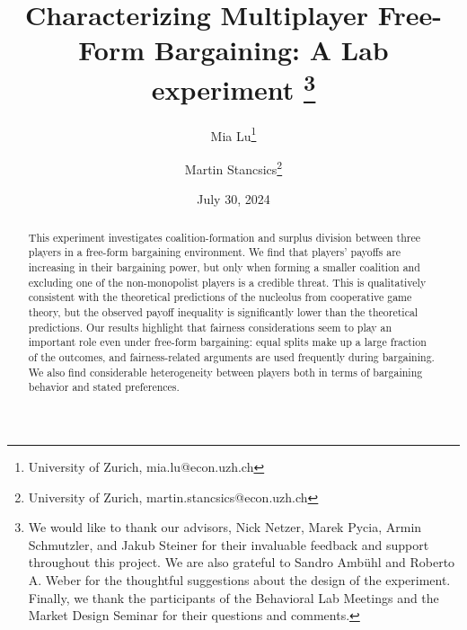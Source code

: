 \documentclass[a4paper]{article}
\title{
    Characterizing Multiplayer Free-Form Bargaining: A Lab experiment%
    \thanks{
        We would like to thank our advisors, Nick Netzer, Marek Pycia, Armin Schmutzler, and Jakub Steiner for their invaluable feedback and support throughout this project.
        We are also grateful to Sandro Ambühl and Roberto A. Weber for the thoughtful suggestions about the design of the experiment.
        Finally, we thank the participants of the Behavioral Lab Meetings and the Market Design Seminar for their questions and comments.
    }
}
\author{
    Mia Lu\thanks{University of Zurich, mia.lu@econ.uzh.ch} 
    \and 
    Martin Stancsics\thanks{University of Zurich, martin.stancsics@econ.uzh.ch}
}
\date{July 30, 2024 \\\vspace{0.4cm} \latestversion}
\begin{document}
\maketitle

\begin{abstract}
    This experiment investigates coalition-formation and surplus division between three players in a free-form bargaining environment.
    We find that players' payoffs are increasing in their bargaining power, but only when forming a smaller coalition and excluding one of the non-monopolist players is a credible threat.
    This is qualitatively consistent with the theoretical predictions of the nucleolus from cooperative game theory, but the observed payoff inequality is significantly lower than the theoretical predictions.
    Our results highlight that fairness considerations seem to play an important role even under free-form bargaining: equal splits make up a large fraction of the outcomes, and fairness-related arguments are used frequently during bargaining.
    We also find considerable heterogeneity between players both in terms of bargaining behavior and stated preferences.
\end{abstract}



\appendix

\printbibliography


\end{document}
